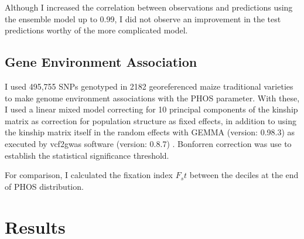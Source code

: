 Although I increased the correlation between observations and predictions using the ensemble model up to 0.99, I did not observe an improvement in the test predictions worthy of the more complicated model.


\subsection{Gene Environment Association}
I used 495,755 SNPs genotyped in 2182 georeferenced maize traditional varieties \citep{romero_navarro2017-cn} to make genome environment associations with the PHOS parameter.
With these, I used a linear mixed model correcting for 10 principal components of the kinship matrix as correction for population structure as fixed effects, in addition to using the kinship matrix itself in the random effects with GEMMA (version: 0.98.3) \citep{vogt2022} as executed by vcf2gwas software (version: 0.8.7) \citep{zhou2012}. Bonforren correction was use to establish the statistical significance threshold.

For comparison, I calculated the fixation index $F_st$ between the deciles at the end of PHOS distribution. 

\section{Results}

